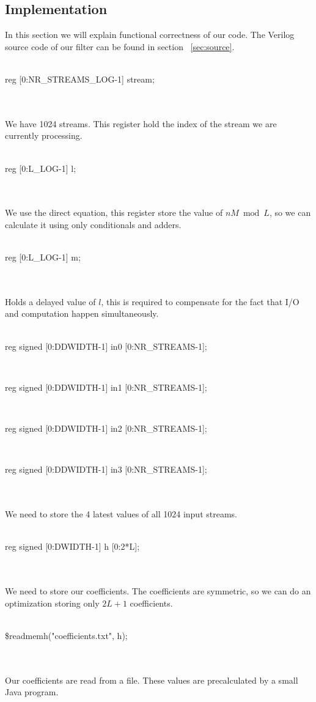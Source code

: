 \subsection{Implementation}
In this section we will explain functional correctness of our code. The Verilog source code of our filter can be found in section ~\ref{sec:source}. \\
\\
\centerline{reg [0:NR\_STREAMS\_LOG-1] stream;}\\
\\
We have 1024 streams. This register hold the index of the stream we are currently processing.\\
\\
\centerline{reg [0:L\_LOG-1] l;}\\
\\
We use the direct equation, this register store the value of $nM \bmod L$, so we can calculate it using only conditionals and adders.\\
\\
\centerline{reg [0:L\_LOG-1] m;}\\
\\
Holds a delayed value of $l$, this is required to compensate for the fact that I/O and computation happen simultaneously.\\
\\
\centerline{reg signed [0:DDWIDTH-1] in0 [0:NR\_STREAMS-1];}\\
\centerline{reg signed [0:DDWIDTH-1] in1 [0:NR\_STREAMS-1];}\\
\centerline{reg signed [0:DDWIDTH-1] in2 [0:NR\_STREAMS-1];}\\
\centerline{reg signed [0:DDWIDTH-1] in3 [0:NR\_STREAMS-1];}\\
\\
We need to store the 4 latest values of all 1024 input streams.\\
\\
\centerline{reg signed [0:DWIDTH-1] h [0:2*L];}\\
\\
We need to store our coefficients. The coefficients are symmetric, so we can do an optimization storing only $2L + 1$ coefficients.\\
\\
\centerline{\$readmemh("coefficients.txt", h);}\\
\\
Our coefficients are read from a file. These values are precalculated by a small Java program.\\
